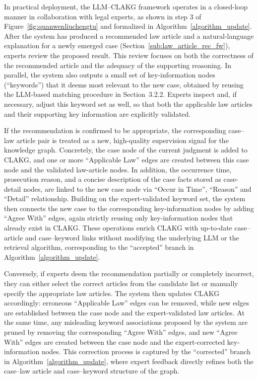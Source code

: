 \documentclass[review,times,nonatbib]{elsarticle} %
\renewcommand{\textcolor}[2]{#2}
\begin{document}
\textcolor{blue}{In practical deployment, the LLM--CLAKG framework operates in a closed-loop manner in collaboration with legal experts, as shown in step 3 of Figure~\ref{fig:quanwenliuchengtu} and formalized in Algorithm~\ref{algorithm_update}. After the system has produced a recommended law article and a natural-language explanation for a newly emerged case (Section~\ref{sub:law_article_rec_fw}), experts review the proposed result. This review focuses on both the correctness of the recommended article and the adequacy of the supporting reasoning. In parallel, the system also outputs a small set of key-information nodes (``keywords'') that it deems most relevant to the new case, obtained by reusing the LLM-based matching procedure in Section~3.2.2. Experts inspect and, if necessary, adjust this keyword set as well, so that both the applicable law articles and their supporting key information are explicitly validated.}

\textcolor{blue}{If the recommendation is confirmed to be appropriate, the corresponding case--law article pair is treated as a new, high-quality supervision signal for the knowledge graph. Concretely, the case node of the current judgment is added to CLAKG, and one or more ``Applicable Law'' edges are created between this case node and the validated law-article nodes. In addition, the occurrence time, prosecution reason, and a concise description of the case facts stored as case-detail nodes, are linked to the new case node via ``Occur in Time'', ``Reason'' and ``Detail'' relationship. Building on the expert-validated keyword set, the system then connects the new case to the corresponding key-information nodes by adding ``Agree With'' edges, again strictly reusing only key-information nodes that already exist in CLAKG. These operations enrich CLAKG with up-to-date case--article and case--keyword links without modifying the underlying LLM or the retrieval algorithm, corresponding to the ``accepted'' branch in Algorithm~\ref{algorithm_update}.}

\textcolor{blue}{Conversely, if experts deem the recommendation partially or completely incorrect, they can either select the correct articles from the candidate list or manually specify the appropriate law articles. The system then updates CLAKG accordingly: erroneous ``Applicable Law'' edges can be removed, while new edges are established between the case node and the expert-validated law articles. At the same time, any misleading keyword associations proposed by the system are pruned by removing the corresponding ``Agree With'' edges, and new ``Agree With'' edges are created between the case node and the expert-corrected key-information nodes. This correction process is captured by the ``corrected'' branch in Algorithm~\ref{algorithm_update}, where expert feedback directly refines both the case--law article and case--keyword structure of the graph.}
\end{document}
